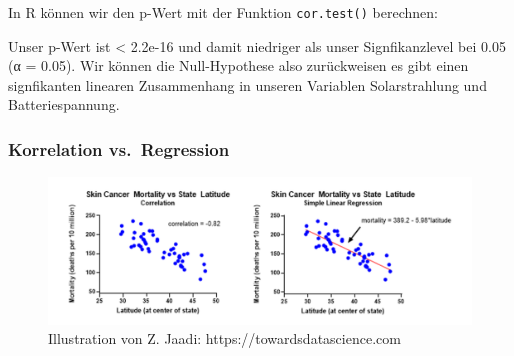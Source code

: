 \documentclass[
]{article}
\newenvironment{Shaded}{\begin{snugshade}}{\end{snugshade}}
\newcommand{\AttributeTok}[1]{\textcolor[rgb]{0.77,0.63,0.00}{#1}}
\newcommand{\DocumentationTok}[1]{\textcolor[rgb]{0.56,0.35,0.01}{\textbf{\textit{#1}}}}
\newcommand{\FunctionTok}[1]{\textcolor[rgb]{0.00,0.00,0.00}{#1}}
\newcommand{\NormalTok}[1]{#1}
\newcommand{\SpecialCharTok}[1]{\textcolor[rgb]{0.00,0.00,0.00}{#1}}
\newcommand{\StringTok}[1]{\textcolor[rgb]{0.31,0.60,0.02}{#1}}
\begin{document}
In R können wir den p-Wert mit der Funktion \texttt{cor.test()} berechnen:

\begin{Shaded}
\end{Shaded}

Unser p-Wert ist \textless{} 2.2e-16 und damit niedriger als unser Signfikanzlevel bei 0.05 (α = 0.05). Wir können die Null-Hypothese also zurückweisen es gibt einen signfikanten linearen Zusammenhang in unseren Variablen Solarstrahlung und Batteriespannung.

\hypertarget{korrelation-vs.-regression}{%
\subsubsection{Korrelation vs.~Regression}\label{korrelation-vs.-regression}}

\begin{figure}

{\centering \includegraphics[width=8.26in]{images/060} 

}

\caption{Illustration von Z. Jaadi: https://towardsdatascience.com}\label{fig:unnamed-chunk-266}
\end{figure}
\end{document}
